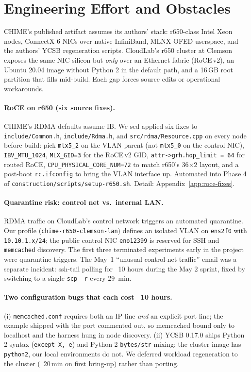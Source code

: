 \documentclass[11pt,a4paper]{article}
\begin{document}
\section{Engineering Effort and Obstacles}
\label{sec:effort}

CHIME's published artifact assumes its authors' stack: r650-class Intel Xeon nodes, ConnectX-6 NICs over native InfiniBand, MLNX OFED userspace, and the authors' YCSB regeneration scripts. CloudLab's r650 cluster at Clemson exposes the same NIC silicon but \emph{only} over an Ethernet fabric (RoCE\,v2), an Ubuntu 20.04 image without Python 2 in the default path, and a 16\,GB root partition that fills mid-build. Each gap forces source edits or operational workarounds.

\paragraph{RoCE on r650 (six source fixes).}\label{sec:effort-roce} CHIME's RDMA defaults assume IB. We sed-applied six fixes to \texttt{include/Common.h}, \texttt{include/Rdma.h}, and \texttt{src/rdma/Resource.cpp} on every node before build: pick \texttt{mlx5\_2} on the VLAN parent (not \texttt{mlx5\_0} on the control NIC), \texttt{IBV\_MTU\_1024}, \texttt{MLX\_GID=3} for the RoCE\,v2 GID, \texttt{attr->grh.hop\_limit = 64} for routed RoCE, \texttt{CPU\_PHYSICAL\_CORE\_NUM=72} to match r650's 36$\times$2 layout, and a post-boot \texttt{rc.ifconfig} to bring the VLAN interface up. Automated into Phase 4 of \texttt{construction/scripts/setup-r650.sh}. Detail: Appendix~\ref{app:roce-fixes}.

\paragraph{Quarantine risk: control net vs.\ internal LAN.} RDMA traffic on CloudLab's control network triggers an automated quarantine. Our profile (\texttt{chime-r650-clemson-lan}) defines an isolated VLAN on \texttt{ens2f0} with \texttt{10.10.1.x/24}; the public control NIC \texttt{eno12399} is reserved for SSH and \texttt{memcached} discovery. The first three terminated experiments early in the project were quarantine triggers. The May~1 ``unusual control-net traffic'' email was a separate incident: ssh-tail polling for ~10 hours during the May 2 sprint, fixed by switching to a single \texttt{scp -r} every 29~min.

\paragraph{Two configuration bugs that each cost ~10 hours.} (i) \texttt{memcached.conf} requires both an IP line \emph{and} an explicit port line; the example shipped with the port commented out, so memcached bound only to localhost and the harness hung in node discovery. (ii) YCSB 0.17.0 ships Python 2 syntax (\texttt{except X, e}) and Python 2 \texttt{bytes/str} mixing; the cluster image has \texttt{python2}, our local environments do not. We deferred workload regeneration to the cluster (~20\,min on first bring-up) rather than porting.
\end{document}
